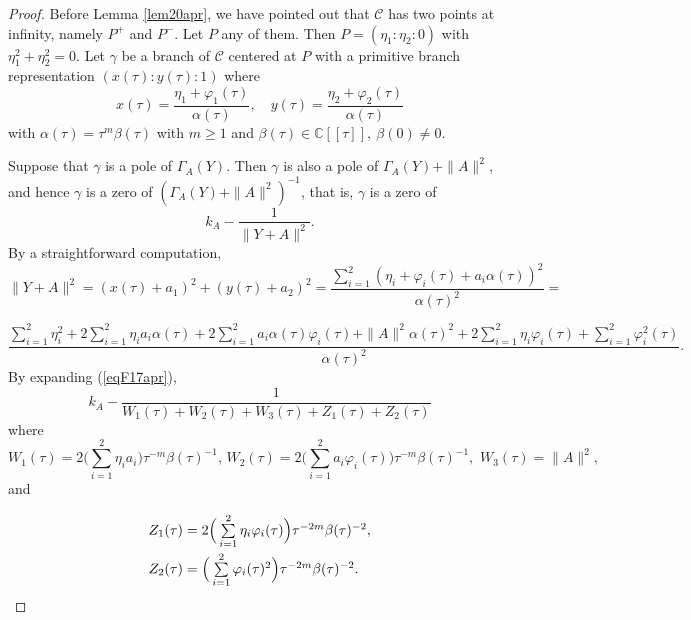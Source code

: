 \documentclass[10pt]{amsart}
\theoremstyle{definition}
\theoremstyle{remark}
\def\cC{\mathcal C}
\begin{document}
\begin{proof} Before Lemma \ref{lem20apr}, we have pointed out that $\cC$ has two points at infinity, namely $P^+$ and $P^-$. Let $P$ any of them. Then $P=(\eta_1:\eta_2:0)$ with $\eta_1^2+\eta_2^2=0$. Let $\gamma$ be a branch of $\cC$ centered at $P$ with a primitive branch representation
$(x(\tau):y(\tau):1)$ where
$$x(\tau)=\frac{\eta_1+\varphi_1(\tau)}{\alpha(\tau)},\quad y(\tau)=\frac{\eta_2+\varphi_2(\tau)}{\alpha(\tau)}$$
with $\alpha(\tau)=\tau^{m} \beta(\tau)$ with $m\ge 1$ and $\beta(\tau)\in \mathbb{C}[[\tau]],\  \beta(0)\neq 0$.

Suppose that  $\gamma$ is a pole of $\Gamma_A(Y)$.  Then $\gamma$ is also a pole of $\Gamma_A(Y)+\|A\|^2$, and hence $\gamma$ is a zero of $(\Gamma_A(Y)+\|A\|^2)^{-1}$, that is, $\gamma$ is a zero of
\begin{equation}
\label{eqF17apr}
k_A-\frac{1}{\|Y+A\|^2}.
\end{equation}
 By a straightforward computation,
$$
\|Y+A\|^2=(x(\tau)+a_1)^2+(y(\tau)+a_2)^2=
\frac{\sum\limits_{i=1}^2(\eta_i+\varphi_i(\tau)+a_i\alpha(\tau))^2}{\alpha(\tau)^2}=
$$



$$\frac{\sum\limits_{i=1}^2 \eta_i^2+2\sum\limits_{i=1}^2 \eta_ia_i\alpha(\tau)+2\sum\limits_{i=1}^2 a_i\alpha(\tau)\varphi_i(\tau)+\|A\|^2\alpha(\tau)^2+2\sum\limits_{i=1}^2 \eta_i\varphi_i(\tau)
+\sum\limits_{i=1}^2 \varphi_i^2(\tau)}{\alpha(\tau)^2}.
$$
By expanding (\ref{eqF17apr}),
$$k_A- \frac{ 1}{W_1(\tau)+W_2(\tau)+W_3(\tau)+Z_1(\tau)+Z_2(\tau)}$$
where
$$
W_1(\tau)=2\Big(\sum\limits_{i=1}^2 \eta_ia_i\Big)\tau^{-m}\beta(\tau)^{-1},\,
W_2(\tau)=2\Big(\sum\limits_{i=1}^2 a_i\varphi_i(\tau)\Big)\tau^{-m}\beta(\tau)^{-1},\,\,
W_3(\tau)=\|A\|^2,
$$
and

\[
\begin{array}{l}
Z_1(\tau)=2\Big(\sum\limits_{i=1}^2 \eta_i\varphi_i(\tau)\Big)\tau^{-2m}\beta(\tau)^{-2},\vspace{0.1cm}\\ 
Z_2(\tau)=\Big(\sum\limits_{i=1}^2\varphi_i(\tau)^2\Big)\tau^{-2m}\beta(\tau)^{-2}.
\end{array}
\]


\end{proof}
\end{document}
